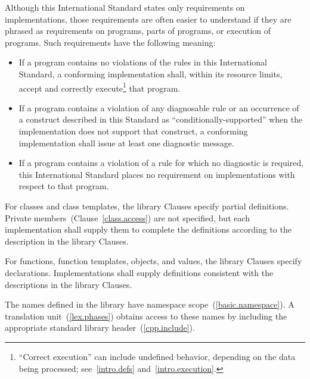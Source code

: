 \pnum
{}%
Although this International Standard states only requirements on \Cpp
implementations, those requirements are often easier to understand if
they are phrased as requirements on programs, parts of programs, or
execution of programs. Such requirements have the following meaning:
\begin{itemize}

\item
If a program contains no violations of the rules in this
International Standard, a conforming implementation shall,
within its resource limits, accept and correctly execute\footnote{``Correct execution'' can include undefined behavior, depending on
the data being processed; see~\ref{intro.defs} and~\ref{intro.execution}.}
that program.

\item
{}%
If a program contains a violation of any diagnosable rule or an occurrence
of a construct described in this Standard as ``conditionally-supported'' when
the implementation does not support that construct, a conforming implementation
shall issue at least one diagnostic message.

\item
{}%
If a program contains a violation of a rule for which no diagnostic
is required, this International Standard places no requirement on
implementations with respect to that program.

\end{itemize}

\pnum
{}%
%
%
For classes and class templates, the library Clauses specify partial
definitions. Private members~(Clause~\ref{class.access}) are not
specified, but each implementation shall supply them to complete the
definitions according to the description in the library Clauses.

\pnum
For functions, function templates, objects, and values, the library
Clauses specify declarations. Implementations shall supply definitions
consistent with the descriptions in the library Clauses.

\pnum
The names defined in the library have namespace
scope~(\ref{basic.namespace}). A \Cpp  translation
unit~(\ref{lex.phases}) obtains access to these names by including the
appropriate standard library header~(\ref{cpp.include}).

